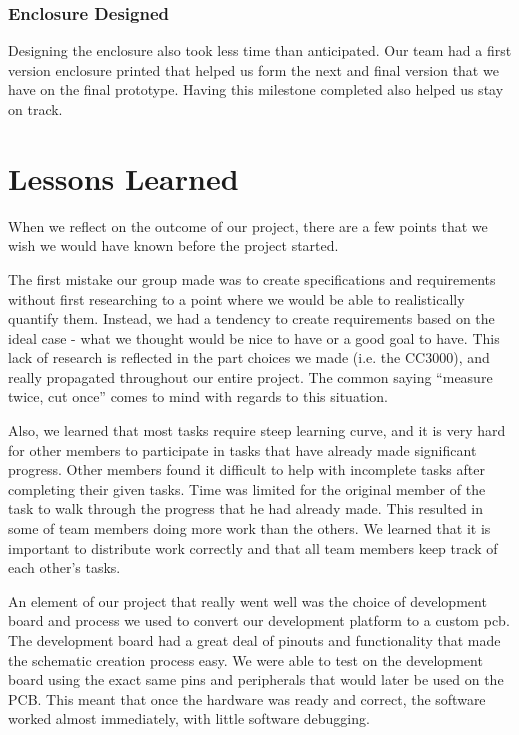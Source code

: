 \documentclass[12pt]{article}
\begin{document}
\subsubsection{Enclosure Designed}
Designing the enclosure also took less time than anticipated. Our team had a
first version enclosure printed that helped us form the next and final version
that we have on the final prototype. Having this milestone completed also
helped us stay on track.

\section{Lessons Learned}
When we reflect on the outcome of our project, there are a few points that we
wish we would have known before the project started.

The first mistake our group made was to create specifications and requirements
without first researching to a point where we would be able to realistically
quantify them. Instead, we had a tendency to create requirements based on the
ideal case - what we thought would be nice to have or a good goal to have. This
lack of research is reflected in the part choices we made (i.e. the CC3000),
and really propagated throughout our entire project. The common saying
``measure twice, cut once'' comes to mind with regards to this situation.

Also, we learned that most tasks require steep learning curve, and it is very
hard for other members to participate in tasks that have already made
significant progress. Other members found it difficult to help with incomplete
tasks after completing their given tasks. Time was limited for the original
member of the task to walk through the progress that he had already made. This
resulted in some of team members doing more work than the others. We learned
that it is important to distribute work correctly and that all team members
keep track of each other's tasks.

An element of our project that really went well was the choice of development
board and process we used to convert our development platform to a custom
\gls{pcb}.  The development board had a great deal of pinouts and functionality
that made the schematic creation process easy. We were able to test on the
development board using the exact same pins and peripherals that would later be
used on the PCB. This meant that once the hardware was ready and correct, the
software worked almost immediately, with little software debugging.
\end{document}

